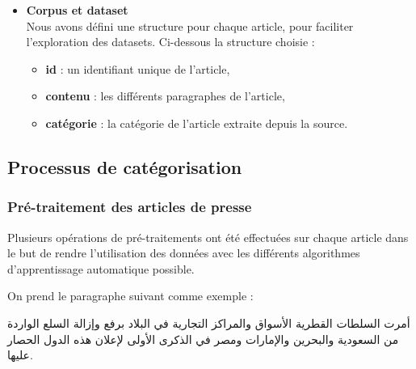     \begin{itemize}[leftmargin=*, label={}]
        \item{\textbf{Corpus et dataset}}\\
            Nous avons défini une structure pour chaque article, pour faciliter l'exploration des datasets. Ci-dessous la structure choisie :
            \begin{itemize}
               \item{\textbf{id} : }un identifiant unique de l'article,
               \item{\textbf{contenu} : }les différents paragraphes de l'article,
               \item{\textbf{catégorie} : }la catégorie de l'article extraite depuis la source.
            \end{itemize}
    \end{itemize}

    \subsection{Processus de catégorisation}
        \subsubsection{Pré-traitement des articles de presse}\label{pretraitement}
        Plusieurs opérations de pré-traitements ont été effectuées sur chaque article dans le but de rendre l'utilisation des données avec les différents algorithmes d'apprentissage automatique possible.

        On prend le paragraphe suivant comme exemple :

            \begin{arab}أمرت السلطات القطرية الأسواق والمراكز التجارية في البلاد برفع وإزالة السلع الواردة من السعودية والبحرين والإمارات ومصر في الذكرى الأولى لإعلان هذه الدول الحصار عليها.\end{arab}
            
